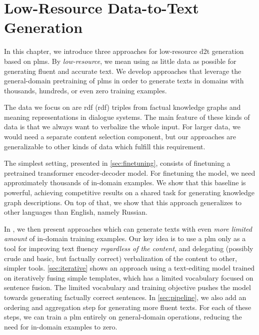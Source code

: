 \chapter{Low-Resource Data-to-Text Generation}
\label{chap:low-res}


In this chapter, we introduce three approaches for low-resource \ac{d2t} generation based on \acp{plm}. By \emph{low-resource}, we mean using as little data as possible for generating fluent and accurate text. We develop approaches that leverage the general-domain pretraining of \acp{plm} in order to generate texts in domains with thousands, hundreds, or even zero training examples.

The data we focus on are \acs{rdf} (\Acl{rdf}) triples from factual knowledge graphs and meaning representations in dialogue systems. The main feature of these kinds of data is that we always want to verbalize the whole input. For larger data, we would need a separate content selection component, but our approaches are generalizable to other kinds of data which fulfill this requirement.

The simplest setting, presented in \autoref{sec:finetuning}, consists of finetuning a pretrained transformer encoder-decoder model. For finetuning the model, we need approximately thousands of in-domain examples. We show that this baseline is powerful, achieving competitive results on a shared task for generating knowledge graph descriptions. On top of that, we show that this approach generalizes to other languages than English, namely Russian.

In , we then present approaches which can generate texts with even \emph{more limited amount} of in-domain training examples. Our key idea is to use a \ac{plm} only as a tool for improving text fluency \emph{regardless of the content}, and delegating (possibly crude and basic, but factually correct) verbalization of the content to other, simpler tools. \autoref{sec:iterative} shows an approach using a text-editing model trained on iteratively fusing simple templates, which has a limited vocabulary focused on sentence fusion. The limited vocabulary and training objective pushes the model towards generating factually correct sentences. In \autoref{sec:pipeline}, we also add an ordering and aggregation step for generating more fluent texts. For each of these steps, we can train a \ac{plm} entirely on general-domain operations, reducing the need for in-domain examples to zero.

